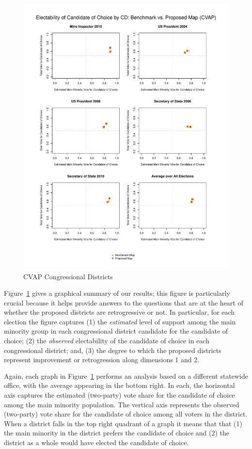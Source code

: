 \documentclass[12pt]{article}
\begin{document}
\begin{figure}[p!h]
\begin{centering}
\includegraphics[scale=.8]{figs/cvap_cd.pdf}
\caption{\label{cvap_cd}CVAP Congressional Districts}
\end{centering}
\end{figure}

Figure~\ref{cvap_cd} gives a graphical summary of our results; this
figure is particularly crucial because it helps provide answers to the
questions that are at the heart of whether the proposed districts are
retrogressive or not. In particular, for each election the figure
captures (1) the {\it estimated} level of support among the main
minority group in each congressional district candidate for the
candidate of choice; (2) the {\it observed} electability of the
candidate of choice in each congressional district; and, (3) the
degree to which the proposed districts represent improvement or
retrogression along dimensions 1 and 2.

Again, each graph in Figure~\ref{cvap_cd} performs an analysis based
on a different statewide office, with the average appearing in the
bottom right.  In each, the horizontal axis captures the estimated
(two-party) vote share for the candidate of choice among the main
minority population. The vertical axis represents the observed
(two-party) vote share for the candidate of choice among all voters in
the district.  When a district falls in the top right quadrant of a
graph it means that that (1) the main minority in the district prefers
the candidate of choice and (2) the district as a whole would have
elected the candidate of choice.
\end{document}
